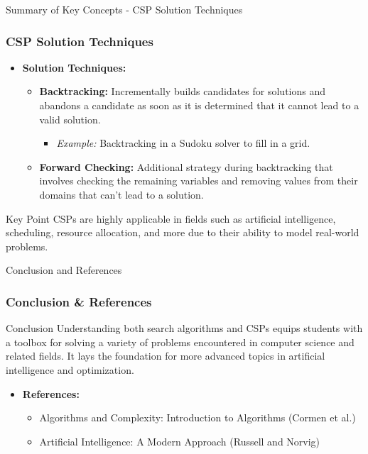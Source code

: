 \documentclass[aspectratio=169]{beamer}
\begin{document}
\begin{frame}[fragile]{Summary of Key Concepts - CSP Solution Techniques}
    \frametitle{CSP Solution Techniques}
    \begin{itemize}
        \item \textbf{Solution Techniques:}
            \begin{itemize}
                \item \textbf{Backtracking:} 
                    Incrementally builds candidates for solutions and abandons a candidate as soon as it is determined that it cannot lead to a valid solution.
                    \begin{itemize}
                        \item \textit{Example:} Backtracking in a Sudoku solver to fill in a grid.
                    \end{itemize}
                \item \textbf{Forward Checking:} 
                    Additional strategy during backtracking that involves checking the remaining variables and removing values from their domains that can't lead to a solution.
            \end{itemize}
    \end{itemize}

    \begin{block}{Key Point}
        CSPs are highly applicable in fields such as artificial intelligence, scheduling, resource allocation, and more due to their ability to model real-world problems.
    \end{block}
\end{frame}

\begin{frame}[fragile]{Conclusion and References}
    \frametitle{Conclusion \& References}
    \begin{block}{Conclusion}
        Understanding both search algorithms and CSPs equips students with a toolbox for solving a variety of problems encountered in computer science and related fields.
        It lays the foundation for more advanced topics in artificial intelligence and optimization.
    \end{block}

    \begin{itemize}
        \item \textbf{References:}
            \begin{itemize}
                \item Algorithms and Complexity: Introduction to Algorithms (Cormen et al.)
                \item Artificial Intelligence: A Modern Approach (Russell and Norvig)
            \end{itemize}
    \end{itemize}
\end{frame}
\end{document}
